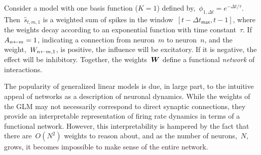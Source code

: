 Consider a model with one basis function ($K=1$) defined
by,~${\phi_{1,\Delta t} = e^{-\Delta t/\tau}}$.
Then~$\widehat{s}_{t,m,1}$ is a weighted sum of spikes in the
window~$[t-\Delta t_{\mathsf{max}},t-1]$, where the weights decay
according to an exponential function with time constant~$\tau$.  
If~${A_{n \leftarrow m}=1}$, indicating a
connection from neuron~$m$ to neuron~$n$, and
the weight,~$W_{n \leftarrow m,1}$, is positive, the influence will be
excitatory. If it is negative, the effect will be inhibitory.
Together, the weights~$\boldsymbol{W}$ define a functional \emph{network} of
interactions.

The popularity of generalized linear models is due, in large part, to
the intuitive appeal of networks as a description of neuronal
dynamics.  While the weights of the GLM may not necessarily correspond
to direct synaptic connections, they provide an interpretable
representation of firing rate dynamics in terms of a functional
network. However, this interpretability is hampered by the fact that
there are~$O(N^2)$ weights to reason about, and as the number of
neurons,~$N$, grows, it becomes impossible to make sense of the entire
network.

